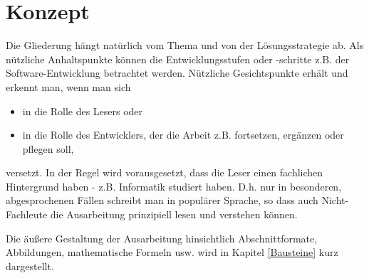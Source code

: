 \chapter{Konzept}

Die Gliederung hängt natürlich vom Thema und von der Lösungsstrategie ab. Als nützliche Anhaltspunkte können die Entwicklungsstufen oder -schritte z.B. der Software-Entwicklung betrachtet werden. Nützliche Gesichtspunkte erhält und erkennt man, wenn man sich

\begin{itemize}
	\item in die Rolle des Lesers oder
	\item in die Rolle des Entwicklers, der die Arbeit z.B. fortsetzen, ergänzen oder pflegen soll,
\end{itemize}

versetzt. In der Regel wird vorausgesetzt, dass die Leser einen fachlichen Hintergrund haben - z.B. Informatik studiert haben. D.h. nur in besonderen, abgesprochenen Fällen schreibt man in populärer Sprache, so dass auch Nicht-Fachleute die Ausarbeitung prinzipiell lesen und verstehen können.

Die äußere Gestaltung der Ausarbeitung hinsichtlich Abschnittformate, Abbildungen, mathematische Formeln usw. wird in Kapitel \ref{Bausteine} kurz dargestellt.
